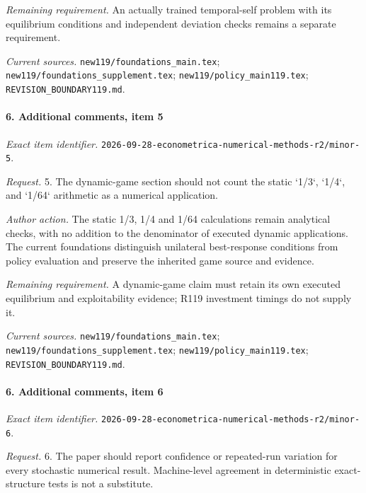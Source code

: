\par\emph{Remaining requirement.} An actually trained temporal-self problem with its equilibrium conditions and independent deviation checks remains a separate requirement.

\par\emph{Current sources.} \nolinkurl{new119/foundations_main.tex}; \nolinkurl{new119/foundations_supplement.tex}; \nolinkurl{new119/policy_main119.tex}; \nolinkurl{REVISION_BOUNDARY119.md}.

\paragraph{6. Additional comments, item 5}

\emph{Exact item identifier.} \nolinkurl{2026-09-28-econometrica-numerical-methods-r2/minor-5}.

\par\emph{Request.} 5. The dynamic-game section should not count the static `1/3`, `1/4`, and `1/64` arithmetic as a numerical application.

\par\emph{Author action.} The static 1/3, 1/4 and 1/64 calculations remain analytical checks, with no addition to the denominator of executed dynamic applications. The current foundations distinguish unilateral best-response conditions from policy evaluation and preserve the inherited game source and evidence.

\par\emph{Remaining requirement.} A dynamic-game claim must retain its own executed equilibrium and exploitability evidence; R119 investment timings do not supply it.

\par\emph{Current sources.} \nolinkurl{new119/foundations_main.tex}; \nolinkurl{new119/foundations_supplement.tex}; \nolinkurl{new119/policy_main119.tex}; \nolinkurl{REVISION_BOUNDARY119.md}.

\paragraph{6. Additional comments, item 6}

\emph{Exact item identifier.} \nolinkurl{2026-09-28-econometrica-numerical-methods-r2/minor-6}.

\par\emph{Request.} 6. The paper should report confidence or repeated-run variation for every stochastic numerical result. Machine-level agreement in deterministic exact-structure tests is not a substitute.

